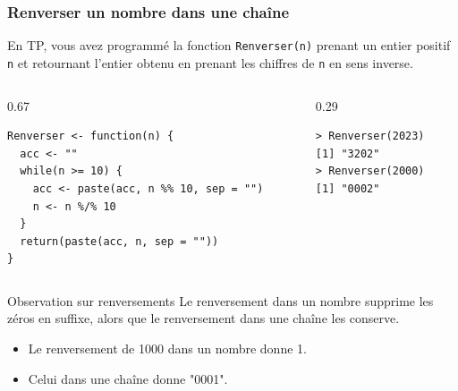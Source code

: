 \documentclass[10pt]{beamer}
\begin{document}
\begin{frame}[fragile]
  \frametitle{Renverser un nombre dans une chaîne}
  En TP, vous avez programmé la fonction \texttt{Renverser(n)} prenant un entier positif \texttt{n} et retournant l’entier obtenu en prenant les chiffres de \texttt{n} en sens inverse.


\begin{columns}[c]
\begin{column}{0.67\textwidth}
  \begin{lstlisting}[style=edblock]
Renverser <- function(n) {
  acc <- ""
  while(n >= 10) {
    acc <- paste(acc, n %% 10, sep = "")
    n <- n %/% 10
  }
  return(paste(acc, n, sep = ""))
}
\end{lstlisting}

\end{column}
\begin{column}{0.29\textwidth}
\begin{lstlisting}
> Renverser(2023)
[1] "3202"
> Renverser(2000)
[1] "0002"
\end{lstlisting}
\end{column}
\end{columns}

\begin{block}{Observation sur renversements}
  Le renversement dans un nombre supprime les zéros en suffixe, alors que le renversement dans une chaîne les conserve.
  \begin{itemize}
  \item Le renversement de 1000 dans un nombre donne 1.
  \item Celui dans une chaîne donne "0001".
  \end{itemize}
\end{block}



\end{frame}
\end{document}
